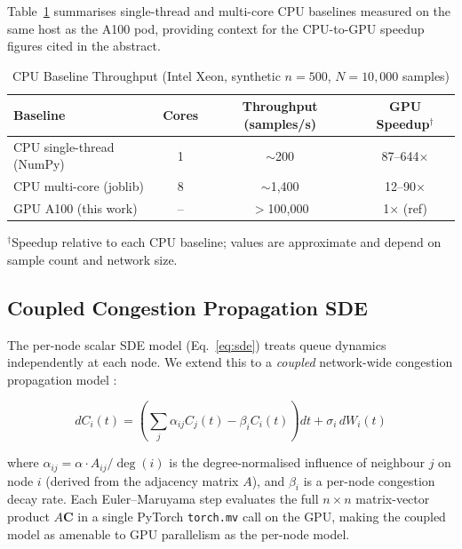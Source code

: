 \documentclass[pdflatex,sn-mathphys-num]{sn-jnl}
\theoremstyle{thmstyleone}%
\theoremstyle{thmstyletwo}%
\theoremstyle{thmstylethree}%
\begin{document}
Table~\ref{tab:cpu_baselines} summarises single-thread and multi-core CPU baselines measured on
the same host as the A100 pod, providing context for the CPU-to-GPU speedup figures cited in the
abstract.

\begin{table}[!t]
\caption{CPU Baseline Throughput (Intel Xeon, synthetic $n{=}500$,
         $N{=}10{,}000$ samples)}
\label{tab:cpu_baselines}
\centering
\begin{tabular}{@{}l c c c@{}}
\toprule
Baseline & Cores & Throughput (samples/s) & GPU Speedup$^\dagger$ \\
\midrule
CPU single-thread (NumPy) & 1  & $\sim$200   & 87--644$\times$ \\
CPU multi-core (joblib)   & 8  & $\sim$1{,}400 & 12--90$\times$  \\
GPU A100 (this work)      & -- & $>$100{,}000 & 1$\times$ (ref) \\
\bottomrule
\end{tabular}
\vspace{2pt}
\footnotesize
$^\dagger$Speedup relative to each CPU baseline; values are
approximate and depend on sample count and network size.
\end{table}

\subsection{Coupled Congestion Propagation SDE}
\label{subsec:spatial}

The per-node scalar SDE model (Eq.~\eqref{eq:sde}) treats queue dynamics independently at each
node. We extend this to a \emph{coupled} network-wide congestion propagation model
\cite{kang2007,harrison1985,mandelbaum2014stochastic}:

\begin{equation}
    dC_i(t) = \left(\sum_j \alpha_{ij} C_j(t) - \beta_i C_i(t)\right)dt
              + \sigma_i\, dW_i(t)
    \label{eq:coupled_sde}
\end{equation}

\noindent where $\alpha_{ij} = \alpha \cdot A_{ij} / \deg(i)$ is the degree-normalised influence
of neighbour $j$ on node $i$ (derived from the adjacency matrix $A$), and $\beta_i$ is a per-node
congestion decay rate. Each Euler--Maruyama step evaluates the full $n \times n$ matrix-vector
product $A\mathbf{C}$ in a single PyTorch \texttt{torch.mv} call on the GPU, making the coupled
model as amenable to GPU parallelism as the per-node model.
\end{document}
